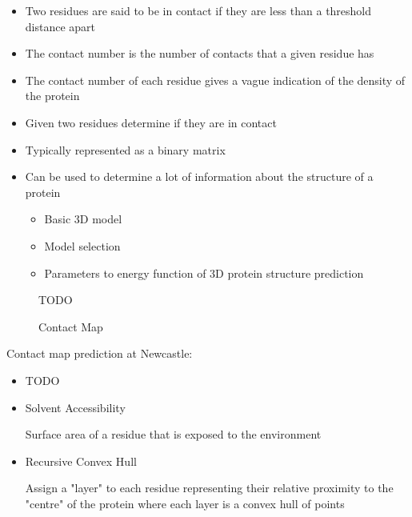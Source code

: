 \documentclass[a4paper]{article}
\begin{document}

\begin{itemize}
  \item
    Two residues are said to be in contact if they are less than a threshold
    distance apart

  \item
    The contact number is the number of contacts that a given residue has

  \item
    The contact number of each residue gives a vague indication of the density
    of the protein
\end{itemize}


\begin{itemize}
  \item
    Given two residues determine if they are in contact

  \item
    Typically represented as a binary matrix

  \item
    Can be used to determine a lot of information about the structure of a
    protein

    \begin{itemize}
      \item
        Basic 3D model

      \item
        Model selection

      \item
        Parameters to energy function of 3D protein structure prediction
    \end{itemize}
\end{itemize}

\begin{figure}[h!]
  \centering
  TODO
  \caption{Contact Map}
  \label{fig:protein_contact_map}
\end{figure}
\FloatBarrier

Contact map prediction at Newcastle:

\begin{itemize}
  \item
    TODO
\end{itemize}


\begin{itemize}
  \item
    Solvent Accessibility

    Surface area of a residue that is exposed to the environment

  \item
    Recursive Convex Hull

    Assign a "layer" to each residue representing their relative proximity to
    the "centre" of the protein where each layer is a convex hull of points
\end{itemize}
\end{document}
